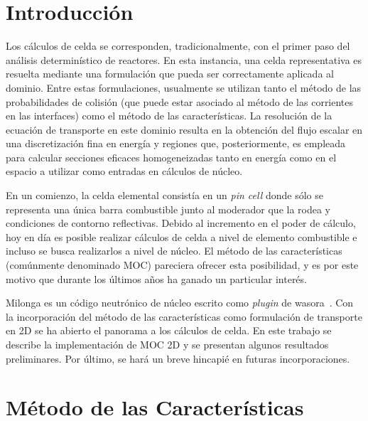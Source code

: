 \documentclass[11pt]{article}
\numberwithin{equation}{section}
\begin{document}
\addtolength{\textheight}{-2cm}

\pagebreak


\renewcommand{\tablename}{Tabla}

\tableofcontents
\pagebreak


\section{Introducción}

Los cálculos de celda se corresponden, tradicionalmente, con el primer paso del análisis determinístico de reactores. En esta instancia, una celda representativa es resuelta mediante una formulación que pueda ser correctamente aplicada al dominio. Entre estas formulaciones, usualmente se utilizan tanto el método de las probabilidades de colisión (que puede estar asociado al método de las corrientes en las interfaces) como el método de las características. La resolución de la ecuación de transporte en este dominio resulta en la obtención del flujo escalar en una discretización fina en energía y regiones que, posteriormente, es empleada para calcular secciones eficaces homogeneizadas tanto en energía como en el espacio a utilizar como entradas en cálculos de núcleo.

En un comienzo, la celda elemental consistía en un \emph{pin cell} donde sólo se representa una única barra combustible junto al moderador que la rodea y condiciones de contorno reflectivas. Debido al incremento en el poder de cálculo, hoy en día es posible realizar cálculos de celda a nivel de elemento combustible e incluso se busca realizarlos a nivel de núcleo. El método de las características (comúnmente denominado MOC) pareciera ofrecer esta posibilidad, y es por este motivo que durante los últimos años ha ganado un particular interés. 

Milonga es un código neutrónico de núcleo escrito como \emph{plugin} de wasora~\cite{wasora}. Con la incorporación del método de las características como formulación de transporte en 2D se ha abierto el panorama a los cálculos de celda. En este trabajo se describe la implementación de MOC 2D y se presentan algunos resultados preliminares. Por último, se hará un breve hincapié en futuras incorporaciones.


\section{Método de las Características}
\end{document}
